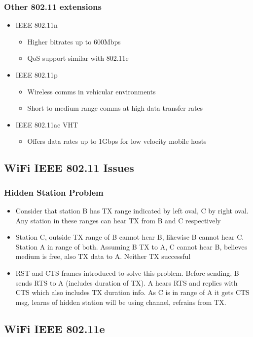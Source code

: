 \subsubsection{Other 802.11 extensions}
\begin{itemize}
	\item IEEE 802.11n
	\begin{itemize}
		\item Higher bitrates up to 600Mbps
		\item QoS support similar with 802.11e
	\end{itemize}
	\item IEEE 802.11p
	\begin{itemize}
		\item Wireless comms in vehicular environments
		\item Short to medium range comms at high data transfer rates
	\end{itemize}
	\item IEEE 802.11ac VHT
	\begin{itemize}
		\item Offers data rates up to 1Gbps for low velocity mobile
			hosts
	\end{itemize}
\end{itemize}
\subsection{WiFi IEEE 802.11 Issues}
\subsubsection{Hidden Station Problem}
\begin{itemize}
	\item Consider that station B has TX range indicated by left oval, C by
		right oval. Any station in these ranges can hear TX from B and C
		respectively
	\item Station C, outside TX range of B cannot hear B, likewise B cannot
		hear C. Station A in range of both. Assuming B TX to A, C cannot
		hear B, believes medium is free, also TX data to A. Neither TX
		successful
	\item RST and CTS frames introduced to solve this problem. Before
		sending, B sends RTS to A (includes duration of TX). A hears RTS
		and replies with CTS which also includes TX duration info. As C
		is in range of A it gets CTS msg, learns of hidden station will
		be using channel, refrains from TX.
\end{itemize}
\subsection{WiFi IEEE 802.11e}
